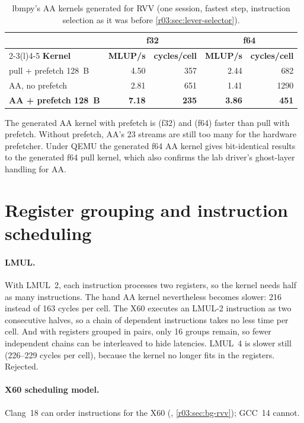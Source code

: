 \begin{table}[htbp]
  \centering\small
  \caption{lbmpy's AA kernels generated for RVV (one session, fastest step, instruction
    selection as it was before \cref{r03:sec:lever-selector}).}\label{r03:tab:genaa}
  \begin{tabular}{@{}lrrrr@{}}
    \toprule
    & \multicolumn{2}{c}{\textbf{f32}} & \multicolumn{2}{c}{\textbf{f64}}\\
    \cmidrule(lr){2-3}\cmidrule(l){4-5}
    \textbf{Kernel} & \textbf{MLUP/s} & \textbf{cycles/cell} & \textbf{MLUP/s} & \textbf{cycles/cell}\\
    \midrule
    pull + prefetch 128~B & 4.50 & 357 & 2.44 & 682\\
    AA, no prefetch & 2.81 & 651 & 1.41 & 1290\\
    \textbf{AA + prefetch 128~B} & \textbf{7.18} & \textbf{235} & \textbf{3.86} & \textbf{451}\\
    \bottomrule
  \end{tabular}
\end{table}

The generated AA kernel with prefetch is  (f32) and  (f64) faster than pull
with prefetch. Without prefetch, AA's 23 streams are still too many for the hardware
prefetcher. Under QEMU the generated f64 AA kernel gives bit-identical results to the generated
f64 pull kernel, which also confirms the lab driver's ghost-layer handling for AA.

\section{Register grouping and instruction scheduling}\label{r03:sec:lever-sched}

\paragraph{LMUL.} With LMUL~2, each instruction processes two registers, so the kernel needs
half as many instructions. The hand AA kernel nevertheless becomes slower: 216 instead of 163
cycles per cell. The X60 executes an LMUL-2 instruction as two consecutive halves, so a chain
of dependent instructions takes no less time per cell. And with registers grouped in pairs, only
16 groups remain, so fewer independent chains can be interleaved to hide latencies. LMUL~4 is
slower still (226--229 cycles per cell), because the kernel no longer fits in the registers.
Rejected.

\paragraph{X60 scheduling model.} Clang~18 can order instructions for the X60
(, \cref{r03:sec:bg-rvv}); GCC~14 cannot.

